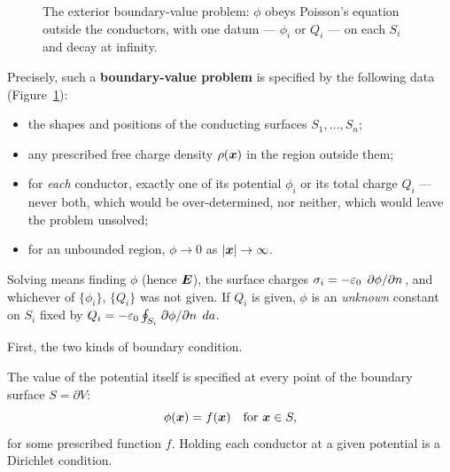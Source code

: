 \begin{figure}[H]
\begin{center}
\end{center}
\caption{The exterior boundary-value problem: $\phi$ obeys Poisson's equation outside the conductors, with one datum --- $\phi_i$ or $Q_i$ --- on each $S_i$ and decay at infinity.}
\label{fig:em-bvp-setup}
\end{figure}

Precisely, such a \textbf{boundary-value problem} is specified by the following data (Figure~\ref{fig:em-bvp-setup}):
\begin{itemize}
    \item the shapes and positions of the conducting surfaces $S_1,\dots,S_n$;
    \item any prescribed free charge density $\rho(\bm{x})$ in the region outside them;
    \item for \emph{each} conductor, exactly one of its potential $\phi_i$ or its total charge $Q_i$ --- never both, which would be over-determined, nor neither, which would leave the problem unsolved;
    \item for an unbounded region, $\phi\to 0$ as $|\bm{x}|\to\infty$.
\end{itemize}
Solving means finding $\phi$ (hence $\vect{E}$), the surface charges $\sigma_i = -\varepsilon_0\,\pdv*{\phi}{n}$, and whichever of $\{\phi_i\}$, $\{Q_i\}$ was not given. If $Q_i$ is given, $\phi$ is an \emph{unknown} constant on $S_i$ fixed by $Q_i = -\varepsilon_0\oint_{S_i}\pdv*{\phi}{n}\,da$.

First, the two kinds of boundary condition.

\begin{definition}
The value of the potential itself is specified at every point of the boundary surface $S = \partial V$:
\[
    \phi(\bm{x}) = f(\bm{x}) \quad\text{for } \bm{x}\in S,
\]
for some prescribed function $f$. Holding each conductor at a given potential is a Dirichlet condition.
\end{definition}

